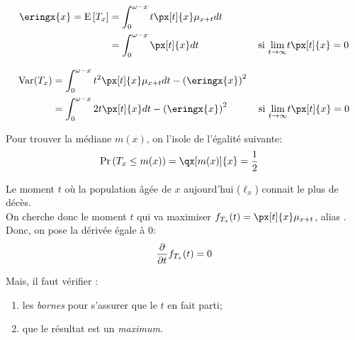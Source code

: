 \documentclass[10pt, french]{article}
\begin{document}
\begin{multicols*}{3}
\setlength{\mathindent}{-1cm}
\begin{definitionNOHFILLsub}
\begin{align*}
	\eringx{x}
	=	\esp{T_{x}}
	&=	\int_{0}^{\omega - x} t \px[t]{x} \mu_{x + t} dt	\\
	&=	\int_{0}^{\omega - x} \px[t]{x} dt	\qquad\qquad\quad\quad	\text{si } \limz{t}{\infty} t \px[t]{x} = 0
\end{align*}
\end{definitionNOHFILLsub}

\begin{definitionNOHFILLprop}[Variance]
\begin{align*}
	\text{Var}(T_{x})
	&=	\int_{0}^{\omega - x} t^{2} \px[t]{x} \mu_{x + t} dt - \left(\eringx{x}\right)^{2}	\\
	&=	\int_{0}^{\omega - x} 2t  \px[t]{x} dt - \left(\eringx{x}\right)^{2}	\qquad\quad	\text{si } \limz{t}{\infty} t \px[t]{x} = 0
\end{align*}
\end{definitionNOHFILLprop}
\setlength{\mathindent}{1cm}

\begin{definitionNOHFILLprop}[Médiane]
Pour trouver la médiane $m(x)$, on l'isole de l'égalité suivante:
\begin{align*}
	\Pr\left(T_{x} \leq m(x)\right)
	&=	\qx[m(x)]{x} 
	=	\frac{1}{2}
\end{align*}
\end{definitionNOHFILLprop}

\begin{definitionNOHFILLprop}[Mode]
Le moment $t$ où la population âgée de $x$ aujourd'hui ($\ell_{x}$) connait le plus de décès.\\
On cherche donc le moment $t$ qui va maximiser $f_{T_{x}}(t) = \px[t]{x} \mu_{x + t}$, alias .\\

Donc, on pose la dérivée égale à 0:
\begin{align*}
	\frac{\partial^{}}{\partial t^{}} f_{T_{x}}(t) 
	&=	0	\\
\end{align*}

Mais, il faut vérifier :
\begin{enumerate}
	\item	les \textit{bornes} pour s'assurer que le $t$ en fait parti;
	\item	que le résultat est un \textit{maximum}.
\end{enumerate}
\end{definitionNOHFILLprop}


\end{multicols*}
\end{document}
